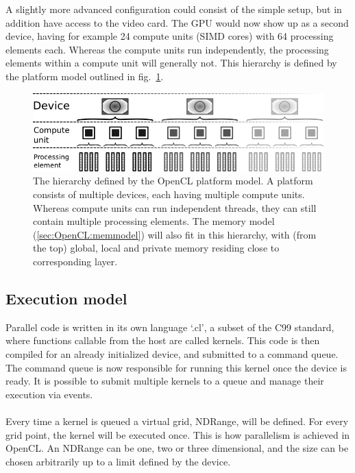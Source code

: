 A slightly more advanced configuration could consist of the simple setup, but in addition have access to the video card.
The GPU would now show up as a second device, having for example 24 compute units (SIMD cores) with 64 processing elements each. Whereas the compute units run independently, the processing elements within a compute unit will generally not.
This hierarchy is defined by the platform model outlined in fig.~\ref{fig:OpenCL:platform}.

\begin{figure}
\begin{center}
\includegraphics[scale=0.5]{../08-OpenCL/figs/platform.png}
\caption{The hierarchy defined by the OpenCL platform model.
A platform consists of multiple devices, each having multiple compute units. Whereas compute units can run independent threads, they can still contain multiple processing elements.
The memory model (\ref{sec:OpenCL:memmodel}) will also fit in this hierarchy, with (from the top) global, local and private memory residing close to corresponding layer.}
\label{fig:OpenCL:platform}
\end{center}
\end{figure}


\subsection{Execution model}
Parallel code is written in its own language `.cl', a subset of the C99 standard, where functions callable from the host are called kernels.
This code is then compiled for an already initialized device, and submitted to a command queue.
The command queue is now responsible for running this kernel once the device is ready. 
It is possible to submit multiple kernels to a queue and manage their execution via events.

\paragraph*{}
Every time a kernel is queued a virtual grid, NDRange, will be defined.
For every grid point, the kernel will be executed once.
This is how parallelism is achieved in OpenCL.
An NDRange can be one, two or three dimensional, and the size can be chosen arbitrarily up to a limit defined by the device.

